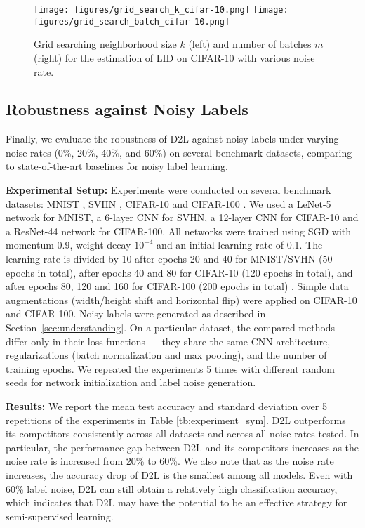 \documentclass{article}
\begin{document}
\begin{figure}[!t]
\centering
\small
\texttt{[image: figures/grid\_search\_k\_cifar-10.png]}
\texttt{[image: figures/grid\_search\_batch\_cifar-10.png]}
\caption{Grid searching neighborhood size $k$ (left) and number of batches $m$ (right) for the estimation of LID on CIFAR-10 with various noise rate.}
\label{fig:tuning_k}
\vspace{-0.2in}
\end{figure}

\subsection{Robustness against Noisy Labels}\label{sec:robustness_test}
Finally, we evaluate the robustness of D2L against noisy labels under varying noise rates (0\%, 20\%, 40\%, and 60\%) on several benchmark datasets, comparing to state-of-the-art baselines for noisy label learning.

\textbf{Experimental Setup:} Experiments were conducted on several benchmark datasets: MNIST \cite{lecun1998gradient}, SVHN \cite{netzer2011reading}, CIFAR-10 \cite{krizhevsky2009learning} and CIFAR-100 \cite{krizhevsky2009learning}. We used a LeNet-5 network \cite{lecun1998gradient} for MNIST, a 6-layer CNN for SVHN, a 12-layer CNN for CIFAR-10 and a ResNet-44 network \cite{he2016deep} for CIFAR-100. 
All networks were trained using SGD with momentum 0.9, weight decay $10^{-4}$ and an initial learning rate of 0.1. The learning rate is divided by 10 after epochs 20 and 40 for MNIST/SVHN (50 epochs in total), after epochs 40 and 80 for CIFAR-10 (120 epochs in total), and after epochs 80, 120 and 160 for CIFAR-100 (200 epochs in total) \cite{huang2016deep}. 
Simple data augmentations (width/height shift and horizontal flip) were applied on CIFAR-10 and CIFAR-100. Noisy labels were generated as described in Section~\ref{sec:understanding}. On a particular dataset, the compared methods differ only in their loss functions --- they share the same CNN architecture, regularizations (batch normalization and max pooling), and the number of training epochs. We repeated the experiments 5 times with different random seeds for network initialization and label noise generation.

\textbf{Results:} We report the mean test accuracy and standard deviation over 5 repetitions of the experiments
in Table \ref{tb:experiment_sym}. D2L outperforms its competitors consistently across all datasets and across all noise rates tested. In particular, the performance gap between D2L and its competitors increases as the noise rate is increased from 20\% to 60\%. We also note that as the noise rate increases, the accuracy drop of D2L is the smallest among all models. Even with 60\% label noise, D2L can still obtain a relatively high classification accuracy, which indicates that D2L may have the potential to be an effective strategy for semi-supervised learning. 
\end{document}
